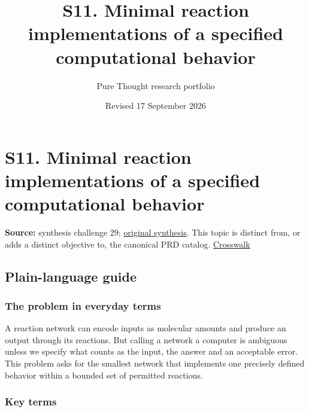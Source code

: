 \documentclass[
  11pt,
]{article}
\title{S11. Minimal reaction implementations of a specified
computational behavior}
\author{Pure Thought research portfolio}
\date{Revised 17 September 2026}
\begin{document}
\maketitle
\thispagestyle{empty}
\clearpage

\section{S11. Minimal reaction implementations of a specified
computational behavior}

\textbf{Source:} synthesis challenge 29;
\href{https://github.com/rick-stevens-ai/Pure-Thought/blob/main/NOTES/30-Most-Compelling-Pure-Thought-AI-Challenges.md}{original
synthesis}. This topic is distinct from, or adds a distinct objective
to, the canonical PRD catalog.
\href{https://github.com/rick-stevens-ai/Pure-Thought/blob/main/reviews/SYNTHESIS-CROSSWALK.md}{Crosswalk}

\subsection{Plain-language guide}

\subsubsection{The problem in everyday terms}

A reaction network can encode inputs as molecular amounts and produce an
output through its reactions. But calling a network a computer is
ambiguous unless we specify what counts as the input, the answer and an
acceptable error. This problem asks for the smallest network that
implements one precisely defined behavior within a bounded set of
permitted reactions.

\subsubsection{Key terms}
\end{document}
